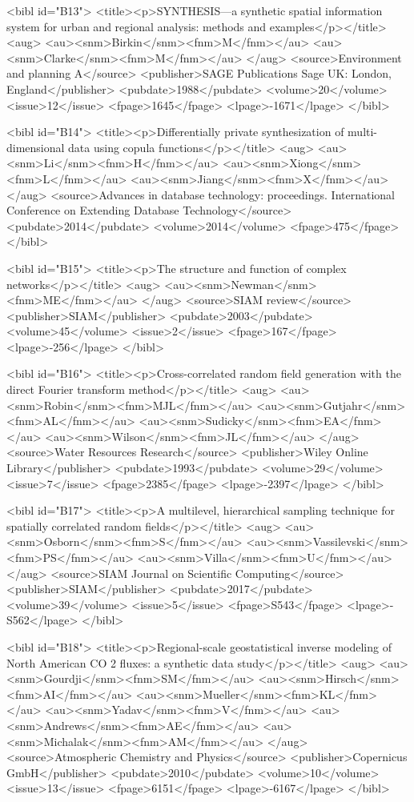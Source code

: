 \documentclass{article}
\begin{document}
{<bibl id="B13">
  <title><p>SYNTHESIS—a synthetic spatial information system for urban and
  regional analysis: methods and examples</p></title>
  <aug>
    <au><snm>Birkin</snm><fnm>M</fnm></au>
    <au><snm>Clarke</snm><fnm>M</fnm></au>
  </aug>
  <source>Environment and planning A</source>
  <publisher>SAGE Publications Sage UK: London, England</publisher>
  <pubdate>1988</pubdate>
  <volume>20</volume>
  <issue>12</issue>
  <fpage>1645</fpage>
  <lpage>-1671</lpage>
</bibl>

<bibl id="B14">
  <title><p>Differentially private synthesization of multi-dimensional data
  using copula functions</p></title>
  <aug>
    <au><snm>Li</snm><fnm>H</fnm></au>
    <au><snm>Xiong</snm><fnm>L</fnm></au>
    <au><snm>Jiang</snm><fnm>X</fnm></au>
  </aug>
  <source>Advances in database technology: proceedings. International
  Conference on Extending Database Technology</source>
  <pubdate>2014</pubdate>
  <volume>2014</volume>
  <fpage>475</fpage>
</bibl>

<bibl id="B15">
  <title><p>The structure and function of complex networks</p></title>
  <aug>
    <au><snm>Newman</snm><fnm>ME</fnm></au>
  </aug>
  <source>SIAM review</source>
  <publisher>SIAM</publisher>
  <pubdate>2003</pubdate>
  <volume>45</volume>
  <issue>2</issue>
  <fpage>167</fpage>
  <lpage>-256</lpage>
</bibl>

<bibl id="B16">
  <title><p>Cross-correlated random field generation with the direct Fourier
  transform method</p></title>
  <aug>
    <au><snm>Robin</snm><fnm>MJL</fnm></au>
    <au><snm>Gutjahr</snm><fnm>AL</fnm></au>
    <au><snm>Sudicky</snm><fnm>EA</fnm></au>
    <au><snm>Wilson</snm><fnm>JL</fnm></au>
  </aug>
  <source>Water Resources Research</source>
  <publisher>Wiley Online Library</publisher>
  <pubdate>1993</pubdate>
  <volume>29</volume>
  <issue>7</issue>
  <fpage>2385</fpage>
  <lpage>-2397</lpage>
</bibl>

<bibl id="B17">
  <title><p>A multilevel, hierarchical sampling technique for spatially
  correlated random fields</p></title>
  <aug>
    <au><snm>Osborn</snm><fnm>S</fnm></au>
    <au><snm>Vassilevski</snm><fnm>PS</fnm></au>
    <au><snm>Villa</snm><fnm>U</fnm></au>
  </aug>
  <source>SIAM Journal on Scientific Computing</source>
  <publisher>SIAM</publisher>
  <pubdate>2017</pubdate>
  <volume>39</volume>
  <issue>5</issue>
  <fpage>S543</fpage>
  <lpage>-S562</lpage>
</bibl>

<bibl id="B18">
  <title><p>Regional-scale geostatistical inverse modeling of North American CO
  2 fluxes: a synthetic data study</p></title>
  <aug>
    <au><snm>Gourdji</snm><fnm>SM</fnm></au>
    <au><snm>Hirsch</snm><fnm>AI</fnm></au>
    <au><snm>Mueller</snm><fnm>KL</fnm></au>
    <au><snm>Yadav</snm><fnm>V</fnm></au>
    <au><snm>Andrews</snm><fnm>AE</fnm></au>
    <au><snm>Michalak</snm><fnm>AM</fnm></au>
  </aug>
  <source>Atmospheric Chemistry and Physics</source>
  <publisher>Copernicus GmbH</publisher>
  <pubdate>2010</pubdate>
  <volume>10</volume>
  <issue>13</issue>
  <fpage>6151</fpage>
  <lpage>-6167</lpage>
</bibl>

}
\end{document}
